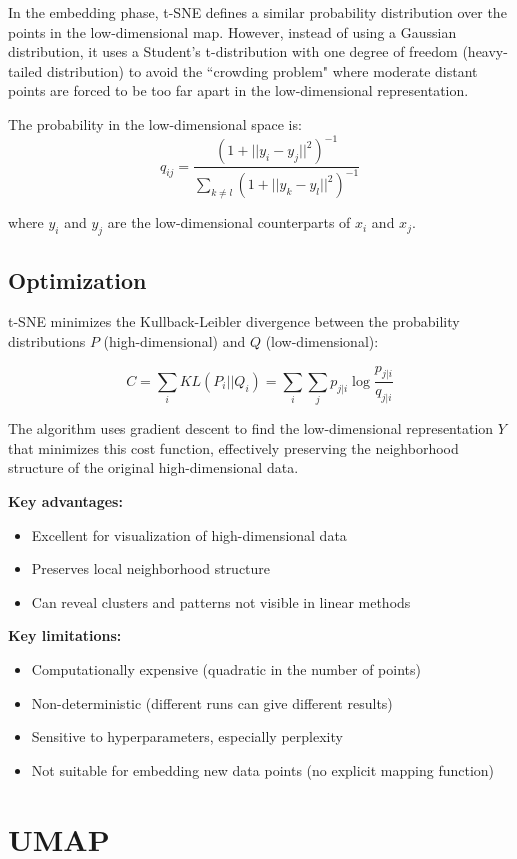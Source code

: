 In the embedding phase, t-SNE defines a similar probability distribution over the points in the low-dimensional map. However, instead of using a Gaussian distribution, it uses a Student's t-distribution with one degree of freedom (heavy-tailed distribution) to avoid the ``crowding problem" where moderate distant points are forced to be too far apart in the low-dimensional representation.

The probability in the low-dimensional space is:
\[
q_{ij} = \frac{(1 + ||y_i - y_j||^2)^{-1}}{\sum_{k \neq l} (1 + ||y_k - y_l||^2)^{-1}}
\]

where $y_i$ and $y_j$ are the low-dimensional counterparts of $x_i$ and $x_j$.

\subsection{Optimization}

t-SNE minimizes the Kullback-Leibler divergence between the probability distributions $P$ (high-dimensional) and $Q$ (low-dimensional):

\[
C = \sum_i KL(P_i||Q_i) = \sum_i \sum_j p_{j|i} \log \frac{p_{j|i}}{q_{j|i}}
\]

The algorithm uses gradient descent to find the low-dimensional representation $Y$ that minimizes this cost function, effectively preserving the neighborhood structure of the original high-dimensional data.

\textbf{Key advantages:}
\begin{itemize}
	\item Excellent for visualization of high-dimensional data
	\item Preserves local neighborhood structure
	\item Can reveal clusters and patterns not visible in linear methods
\end{itemize}

\textbf{Key limitations:}
\begin{itemize}
	\item Computationally expensive (quadratic in the number of points)
	\item Non-deterministic (different runs can give different results)
	\item Sensitive to hyperparameters, especially perplexity
	\item Not suitable for embedding new data points (no explicit mapping function)
\end{itemize}

\section{UMAP}

